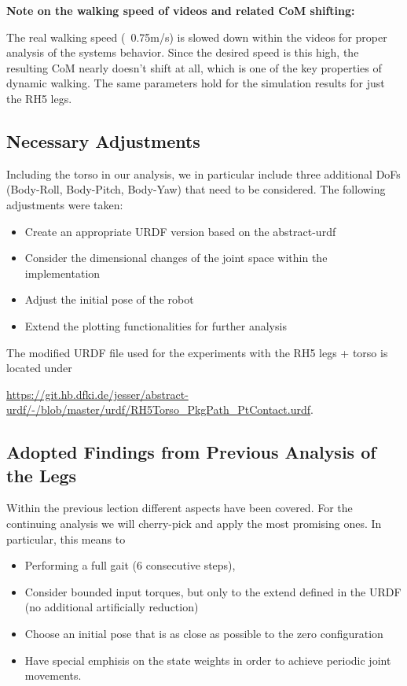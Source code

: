 \textbf{Note on the walking speed of videos and related CoM shifting:} 

The real walking speed (~0.75m/s) is slowed down within the videos for proper analysis of the systems behavior. Since the desired speed is this high, the resulting CoM nearly doesn't shift at all, which is one of the key properties of dynamic walking. The same parameters hold for the simulation results for just the RH5 legs.  


\subsection{Necessary Adjustments}
Including the torso in our analysis, we in particular include three additional DoFs (Body-Roll, Body-Pitch, Body-Yaw) that need to be considered. The following adjustments were taken:
\begin{itemize}
\item Create an appropriate URDF version based on the abstract-urdf
\item Consider the dimensional changes of the joint space within the implementation
\item Adjust the initial pose of the robot
\item Extend the plotting functionalities for further analysis
\end{itemize}

The modified URDF file used for the experiments with the RH5 legs + torso is located under

\url{https://git.hb.dfki.de/jesser/abstract-urdf/-/blob/master/urdf/RH5Torso_PkgPath_PtContact.urdf}.

\subsection{Adopted Findings from Previous Analysis of the Legs}
Within the previous lection different aspects have been covered. For the continuing analysis we will cherry-pick and apply the most promising ones. In particular, this means to 
\begin{itemize}
\item Performing a full gait (6 consecutive steps),
\item Consider bounded input torques, but only to the extend defined in the URDF (no additional artificially reduction)
\item Choose an initial pose that is as close as possible to the zero configuration
\item Have special emphisis on the state weights in order to achieve periodic joint movements.
\end{itemize}

